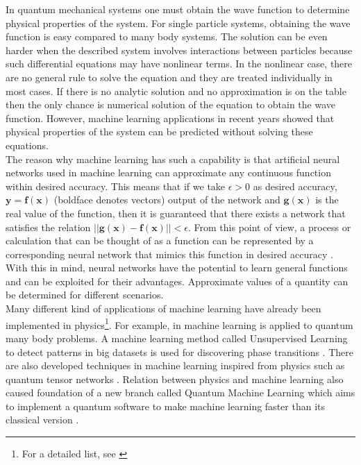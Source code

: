 \documentclass[a4paper,times,hidelinks,12pt]{article}
\begin{document}
In quantum mechanical systems one must obtain the wave function to determine physical properties of the system. For single particle systems, obtaining the wave function is easy compared to many body systems. The solution can be even harder when the described system involves interactions between particles because such differential equations may have nonlinear terms. In the nonlinear case, there are no general rule to solve the equation and they are treated individually in most cases. If there is no analytic solution and no approximation is on the table then the only chance is numerical solution of the equation to obtain the wave function. However, machine learning applications in recent years showed that physical properties of the system can be predicted without solving these equations. \\

The reason why machine learning has such a capability is that artificial neural networks used in machine learning can approximate any continuous function within desired accuracy. This means that if we take $\epsilon > 0$ as desired accuracy,  $\boldsymbol{y} = \boldsymbol{f}(\boldsymbol{x})$ (boldface denotes vectors) output of the network and $\boldsymbol{g}(\boldsymbol{x})$ is the real value of the function, then it is guaranteed that there exists a network that satisfies the relation $||\boldsymbol{g}(\boldsymbol{x}) - \boldsymbol{f}(\boldsymbol{x})|| < \epsilon $. From this point of view, a process or calculation that can be thought of as a function can be represented by a corresponding neural network that mimics this function in desired accuracy \cite{nielsen2015neural}. With this in mind, neural networks have the potential to learn general functions and can be exploited for their advantages. Approximate values of a quantity can be determined for different scenarios. \\

Many different kind of applications of machine learning have already been implemented in physics\footnote{For a detailed list, see \cite{physicsml}}. For example, in \cite{carleo2017solving, cai2017approximating} machine learning is applied to quantum many body problems. A machine learning method called Unsupervised Learning to detect patterns in big datasets is used for discovering phase transitions \cite{wang2016discovering}. There are also developed techniques in machine learning inspired from physics such as quantum tensor networks \cite{stoudenmire2016supervised}. Relation between physics and machine learning also caused foundation of a new branch called Quantum Machine Learning which aims to implement a quantum software to make machine learning faster than its classical version \cite{biamonte1611quantum}. \\
\end{document}
